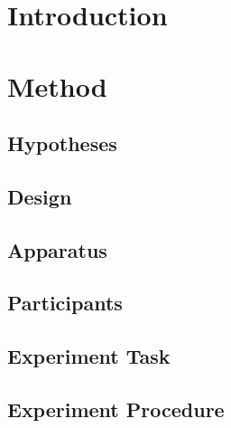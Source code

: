 \section{Introduction} \label{sec:exp1:Intro}


\section{Method} \label{sec:exp1:Method}


%

\subsection{Hypotheses} \label{sec:exp1:Hypotheses}


\subsection{Design} \label{sec:exp1:Method:Design}


\subsection{Apparatus} \label{sec:exp1:Method:Apparatus}


\subsection{Participants} \label{sec:exp1:Method:Participants}


\subsection{Experiment Task} \label{sec:exp1:Method:Task}


\subsection{Experiment Procedure} \label{sec:exp1:Method:Procedure}


